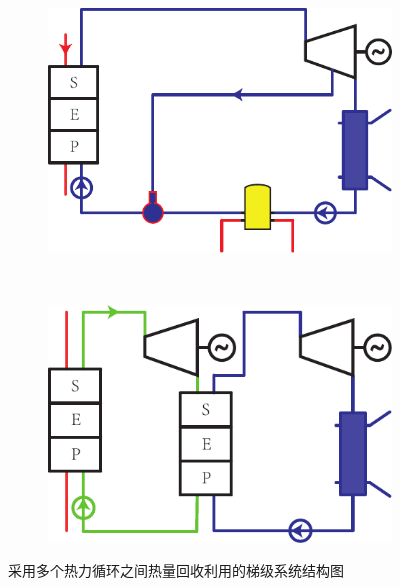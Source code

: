 \noindent \begin{figure}[htbp]
\centering
	\begin{subfigure}[b]{0.4\columnwidth}
	\includegraphics[width = \columnwidth]{fig/Stirling-Rankine}
	\caption{}\label{fig:Stirling-Rankine}
	\end{subfigure}
	~
\begin{subfigure}[b]{0.4\columnwidth}
	\includegraphics[width = \columnwidth]{fig/SeriesRankine}
	\caption{}\label{fig:Rankine-Rankine}
	\end{subfigure}
	\caption{采用多个热力循环之间热量回收利用的梯级系统结构图}
	\label{fig:coupledCycles}
\end{figure}

